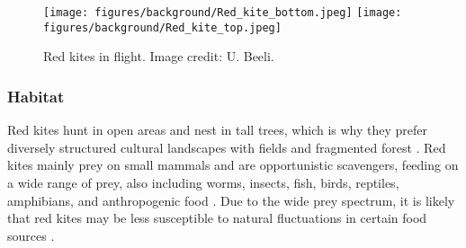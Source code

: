 \vspace{1\baselineskip}

\begin{figure}[H]
\centering
\texttt{[image: figures/background/Red\_kite\_bottom.jpeg]}
\texttt{[image: figures/background/Red\_kite\_top.jpeg]}
\caption[Red kites in flight]{Red kites in flight. Image credit: U. Beeli.}
\label{figure:red_kites}
\end{figure}

\subsubsection{Habitat}
Red kites hunt in open areas and nest in tall trees, which is why they prefer diversely structured cultural landscapes with fields and fragmented forest \parencite{mougeot2011breeding}. Red kites mainly prey on small mammals and are opportunistic scavengers, feeding on a wide range of prey, also including worms, insects, fish, birds, reptiles, amphibians, and anthropogenic food \parencite{aebischer2021rotmilan, cereghetti2019quantification, orros2015widespread, welti2019carcass}. Due to the wide prey spectrum, it is likely that red kites may be less susceptible to natural fluctuations in certain food sources \parencite{aebischer2021rotmilan, mougeot2011breeding}.

